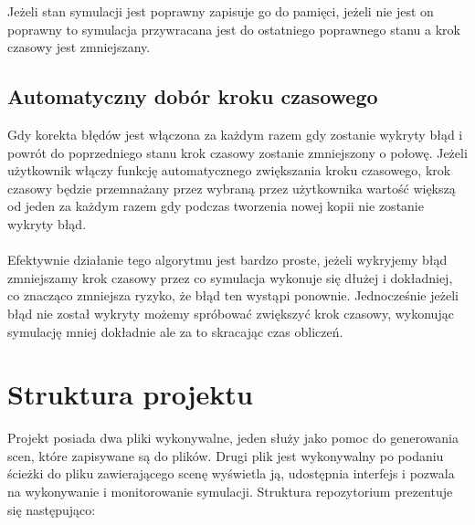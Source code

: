 \documentclass[12pt, letterpaper]{report}
\begin{document}
    Jeżeli 
    stan symulacji jest poprawny zapisuje go do pamięci, jeżeli nie jest on poprawny to symulacja 
    przywracana jest do ostatniego poprawnego stanu a krok czasowy jest zmniejszany.

    \subsection{Automatyczny dobór kroku czasowego}
    Gdy korekta błędów jest włączona za każdym razem gdy zostanie wykryty błąd i powrót do poprzedniego stanu
    krok czasowy zostanie zmniejszony o połowę. Jeżeli użytkownik włączy funkcję automatycznego zwiększania
    kroku czasowego, krok czasowy będzie przemnażany przez wybraną przez użytkownika wartość większą od 
    jeden za każdym razem gdy podczas tworzenia nowej kopii nie zostanie wykryty błąd. \\ \\
    
    Efektywnie działanie tego algorytmu jest bardzo proste, jeżeli wykryjemy błąd zmniejszamy krok czasowy
    przez co symulacja wykonuje się dłużej i dokładniej, co znacząco zmniejsza ryzyko, że błąd
    ten wystąpi ponownie. Jednocześnie jeżeli błąd nie został wykryty możemy spróbować zwiększyć 
    krok czasowy, wykonując symulację mniej dokładnie ale za to skracając czas obliczeń.

    \clearpage
    \section{Struktura projektu}
    Projekt posiada dwa pliki wykonywalne, jeden służy jako pomoc do generowania scen, które zapisywane są 
    do plików. Drugi plik jest wykonywalny po podaniu ścieżki do pliku zawierającego scenę wyświetla ją, 
    udostępnia interfejs i pozwala na wykonywanie i monitorowanie symulacji. Struktura repozytorium
    prezentuje się następująco: \\

\end{document}

